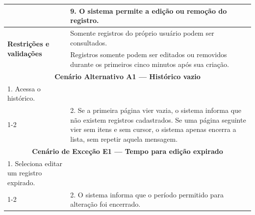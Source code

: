 \begin{longtable}{| p{} | p{} |}
&
9. O sistema permite a edição ou remoção do registro. \\
\hline

\multirow{2}{.40\textwidth}{\textbf{Restrições e validações}}
&
Somente registros do próprio usuário podem ser consultados. \\
\cline{2-2}

&
Registros somente podem ser editados ou removidos durante os
primeiros cinco minutos após sua criação. \\
\hline

\multicolumn{2}{|c|}{\textbf{Cenário Alternativo A1 --- Histórico vazio}}\\
\hline

1. Acessa o histórico. & \\
\cline{1-2}

&
2. Se a primeira página vier vazia, o sistema informa que não existem
registros cadastrados. Se uma página seguinte vier sem itens e sem cursor, o
sistema apenas encerra a lista, sem repetir aquela mensagem. \\
\hline

\multicolumn{2}{|c|}{\textbf{Cenário de Exceção E1 --- Tempo para edição expirado}}\\
\hline

1. Seleciona editar um registro expirado. & \\
\cline{1-2}

&
2. O sistema informa que o período permitido para alteração foi encerrado. \\
\hline

\end{longtable}
